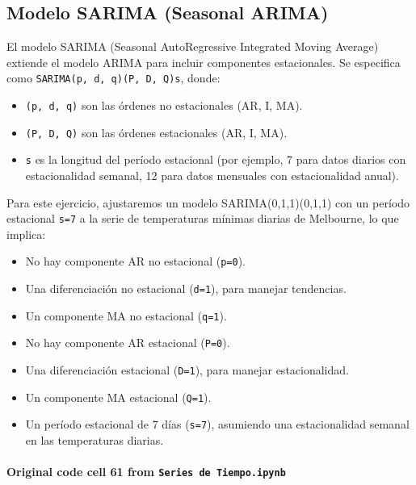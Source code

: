 \documentclass[
  11pt,
]{article}
\providecommand{\tightlist}{%
  \setlength{\itemsep}{0pt}\setlength{\parskip}{0pt}}
\begin{document}
\subsection{Modelo SARIMA (Seasonal ARIMA)}\label{modelo-sarima-seasonal-arima}

El modelo SARIMA (Seasonal AutoRegressive Integrated Moving Average) extiende el modelo ARIMA para incluir componentes estacionales. Se especifica como \texttt{SARIMA(p,\ d,\ q)(P,\ D,\ Q)s}, donde:

\begin{itemize}
\tightlist
\item
  \texttt{(p,\ d,\ q)} son las órdenes no estacionales (AR, I, MA).
\item
  \texttt{(P,\ D,\ Q)} son las órdenes estacionales (AR, I, MA).
\item
  \texttt{s} es la longitud del período estacional (por ejemplo, 7 para datos diarios con estacionalidad semanal, 12 para datos mensuales con estacionalidad anual).
\end{itemize}

Para este ejercicio, ajustaremos un modelo SARIMA(0,1,1)(0,1,1) con un período estacional \texttt{s=7} a la serie de temperaturas mínimas diarias de Melbourne, lo que implica:

\begin{itemize}
\tightlist
\item
  No hay componente AR no estacional (\texttt{p=0}).
\item
  Una diferenciación no estacional (\texttt{d=1}), para manejar tendencias.
\item
  Un componente MA no estacional (\texttt{q=1}).
\item
  No hay componente AR estacional (\texttt{P=0}).
\item
  Una diferenciación estacional (\texttt{D=1}), para manejar estacionalidad.
\item
  Un componente MA estacional (\texttt{Q=1}).
\item
  Un período estacional de 7 días (\texttt{s=7}), asumiendo una estacionalidad semanal en las temperaturas diarias.
\end{itemize}

\paragraph{\texorpdfstring{Original code cell 61 from \texttt{Series\ de\ Tiempo.ipynb}}{Original code cell 61 from Series de Tiempo.ipynb}}\label{original-code-cell-61-from-series-de-tiempoipynb}
\end{document}
